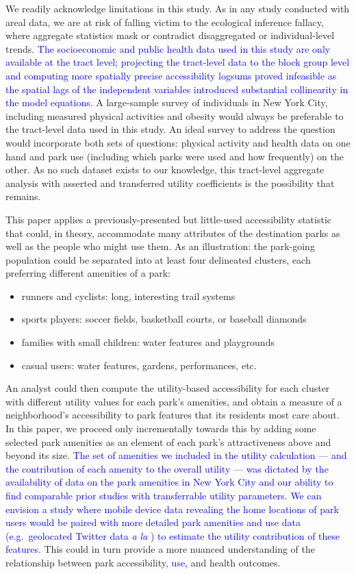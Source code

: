 \documentclass[shortAfour,sageh.bst]{sagej}
\begin{document}
We readily acknowledge limitations in this study. As in any study
conducted with areal data, we are at risk of falling victim to the
ecological inference fallacy, where aggregate statistics mask or
contradict disaggregated or individual-level trends. \textcolor{blue}{The socioeconomic
and public health data used in this study are only available at the
tract level; projecting the tract-level data to the block group level
and computing more spatially precise accessibility logsums proved
infeasible as the spatial lags of the independent variables introduced
substantial collinearity in the model equations.} A large-sample survey
of individuals in New York City, including measured physical activities
and obesity would always be preferable to the tract-level data used in
this study. An ideal survey to address the question would incorporate
both sets of questions: physical activity and health data on one hand
and park use (including which parks were used and how frequently) on the
other. As no such dataset exists to our knowledge, this tract-level
aggregate analysis with asserted and transferred utility coefficients is
the possibility that remains.

This paper applies a previously-presented but little-used accessibility
statistic that could, in theory, accommodate many attributes of the
destination parks as well as the people who might use them. As an
illustration: the park-going population could be separated into at least
four delineated clusters, each preferring different amenities of a park:

\begin{itemize}
 \item{runners and cyclists: long, interesting trail systems}
 \item{sports players: soccer fields, basketball courts, or baseball diamonds}
 \item{families with small children: water features and playgrounds}
 \item{casual users: water features, gardens, performances, etc.}
\end{itemize}

An analyst could then compute the utility-based accessibility for each
cluster with different utility values for each park's amenities, and
obtain a measure of a neighborhood's accessibility to park features that
its residents most care about. In this paper, we proceed only
incrementally towards this by adding some selected park amenities as an
element of each park's attractiveness above and beyond its size. \textcolor{blue}{The set
of amenities we included in the utility calculation --- and the
contribution of each amenity to the overall utility --- was dictated by
the availability of data on the park amenities in New York City and our
ability to find comparable prior studies with transferrable utility
parameters. We can envision a study where mobile device data revealing
the home locations of park users would be paired with more detailed park
amenities and use data (e.g.~geolocated Twitter data \emph{a la}
\citet{roberts2017using}) to estimate the utility contribution of these
features.} This could in turn provide a more nuanced understanding of the
relationship between park accessibility, \textcolor{blue}{use,} and health outcomes.
\end{document}
